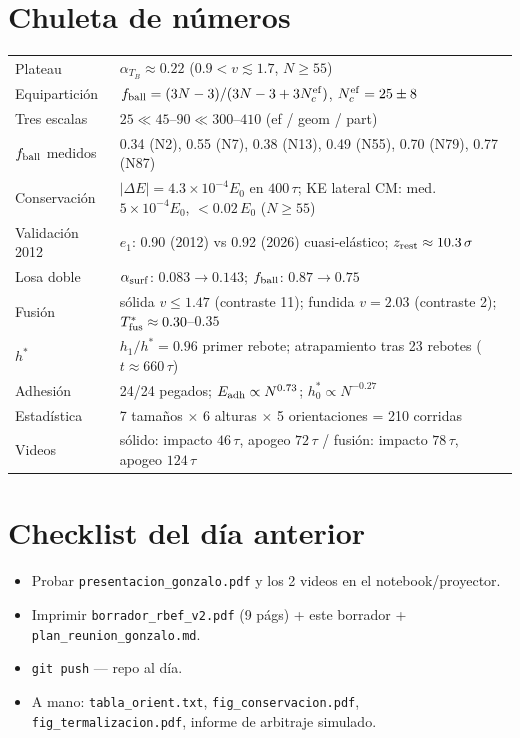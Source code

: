 \documentclass[11pt]{article}
\begin{document}
\section*{Chuleta de números}
\begin{center}
\small
\begin{tabular}{ll}
\toprule
Plateau & $\alpha_{T_B}\approx0.22$ ($0.9<v\lesssim1.7$, $N\ge55$) \\
Equipartición & $f_{\rm ball}=(3N-3)/(3N-3+3N_c^{\rm ef})$, $N_c^{\rm ef}=25\pm8$ \\
Tres escalas & $25\ll45$--$90\ll300$--$410$ (ef / geom / part) \\
$f_{\rm ball}$ medidos & 0.34 (N2), 0.55 (N7), 0.38 (N13), 0.49 (N55), 0.70 (N79), 0.77 (N87) \\
Conservación & $|\Delta E|=4.3\times10^{-4}E_0$ en $400\,\tau$; KE lateral CM: med.\ $5\times10^{-4}E_0$, $<0.02\,E_0$ ($N\ge55$) \\
Validación 2012 & $e_1$: 0.90 (2012) vs 0.92 (2026) cuasi-elástico; $z_{\rm rest}\approx10.3\,\sigma$ \\
Losa doble & $\alpha_{\rm surf}$: $0.083\to0.143$; $f_{\rm ball}$: $0.87\to0.75$ \\
Fusión & sólida $v\le1.47$ (contraste 11); fundida $v=2.03$ (contraste 2); $T_{\rm fus}^*\approx0.30$--$0.35$ \\
$h^*$ & $h_1/h^*=0.96$ primer rebote; atrapamiento tras 23 rebotes ($t\approx660\,\tau$) \\
Adhesión & 24/24 pegados; $E_{\rm adh}\propto N^{0.73}$; $h_0^*\propto N^{-0.27}$ \\
Estadística & 7 tamaños $\times$ 6 alturas $\times$ 5 orientaciones = 210 corridas \\
Videos & sólido: impacto $46\,\tau$, apogeo $72\,\tau$ / fusión: impacto $78\,\tau$, apogeo $124\,\tau$ \\
\bottomrule
\end{tabular}
\end{center}

\section*{Checklist del día anterior}
\begin{itemize}[leftmargin=1.4em]
    \item[$\square$] Probar \texttt{presentacion\_gonzalo.pdf} y los 2
    videos en el notebook/proyector.
    \item[$\square$] Imprimir \texttt{borrador\_rbef\_v2.pdf} (9 págs) +
    este borrador + \texttt{plan\_reunion\_gonzalo.md}.
    \item[$\square$] \texttt{git push} --- repo al día.
    \item[$\square$] A mano: \texttt{tabla\_orient.txt},
    \texttt{fig\_conservacion.pdf}, \texttt{fig\_termalizacion.pdf},
    informe de arbitraje simulado.
\end{itemize}
\end{document}
